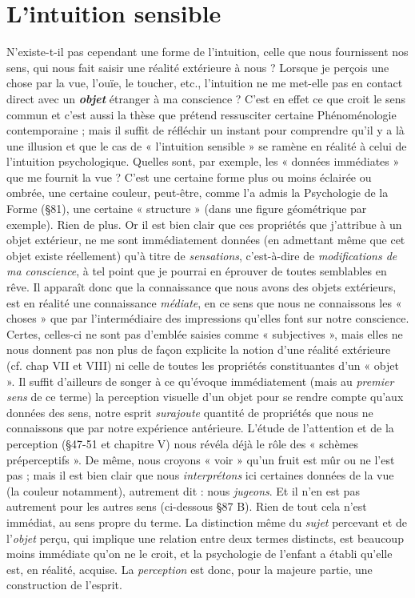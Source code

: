 \section{L’intuition sensible}%
N’existe-t-il pas cependant une forme
de l’intuition, celle que nous fournissent nos sens, qui nous fait saisir
une réalité extérieure à nous ? Lorsque je perçois une chose par la vue,
l’ouïe, le toucher, etc., l’intuition ne me met-elle pas en contact direct
avec un \textbf{\textit {objet}} étranger à ma conscience ? C’est en effet ce que croit le
sens commun et c’est aussi la thèse que prétend ressusciter certaine
Phénoménologie contemporaine ; mais il suffit de réfléchir un instant
pour comprendre qu’il y a là une illusion et que le cas de « l'intuition
sensible » se ramène en réalité à celui de l'intuition psychologique.
Quelles sont, par exemple, les « données immédiates » que me fournit
la vue ? C’est une certaine forme plus ou moins éclairée ou ombrée,
une certaine couleur, peut-être, comme l’a admis la Psychologie de
la Forme (\S 81), une certaine « structure » (dans une figure géométrique
par exemple). Rien de plus. Or il est bien clair que ces propriétés
que j’attribue à un objet extérieur, ne me sont immédiatement
données (en admettant même que cet objet existe réellement) qu’à
titre de {\it sensations}, c’est-à-dire de {\it modifications de ma conscience}, à tel
point que je pourrai en éprouver de toutes semblables en rêve. Il
apparaît donc que la connaissance que nous avons des objets extérieurs,
est en réalité une connaissance {\it médiate}, en ce sens que nous ne
connaissons les « choses » que par l'intermédiaire des impressions
qu’elles font sur notre conscience. Certes, celles-ci ne sont pas d'emblée
saisies comme « subjectives », mais elles ne nous donnent pas non
plus de façon explicite la notion d’une réalité extérieure (cf. chap VII
et VIII) ni celle de toutes les propriétés constituantes d’un « objet ».
Il suffit d’ailleurs de songer à ce qu’évoque immédiatement (mais
au {\it premier sens} de ce terme) la perception visuelle d’un objet pour
se rendre compte qu'aux données des sens, notre esprit {\it surajoute}
quantité de propriétés que nous ne connaissons que par notre expérience
antérieure. L’étude de l’attention et de la perception (\S 47-51
et chapitre V) nous révéla déjà le rôle des « schèmes préperceptifs ».
De même, nous croyons « voir » qu’un fruit est mûr ou ne l’est
pas ; mais il est bien clair que nous {\it interprétons} ici certaines données
de la vue (la couleur notamment), autrement dit : nous {\it jugeons}. Et il
n’en est pas autrement pour les autres sens (ci-dessous \S 87 B). Rien
de tout cela n’est immédiat, au sens propre du terme. La distinction
même du {\it sujet} percevant et de l’{\it objet} perçu, qui implique une relation
entre deux termes distincts, est beaucoup moins immédiate qu’on ne
le croit, et la psychologie de l’enfant a établi qu’elle est, en réalité,
acquise. La {\it perception} est donc, pour la majeure partie, une construction
de l'esprit.


